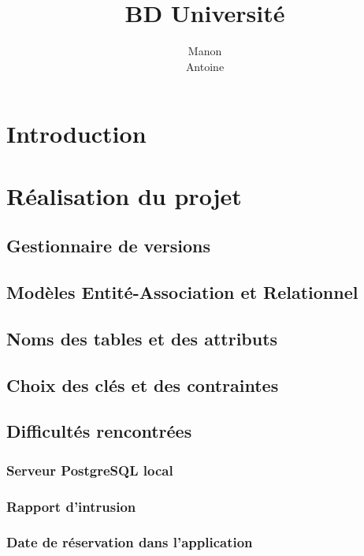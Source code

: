 \documentclass[12pt,titlepage,a4paper]{report}
\title{BD Université}
\author{Manon \bsc{Ansart}\\ Antoine \bsc{Augusti}}
\begin{document}

	\dominitoc
	\tableofcontents

	\chapter{Introduction}
		

	\chapter{Réalisation du projet}
		\section{Gestionnaire de versions}
		

		\section{Modèles Entité-Association et Relationnel}
		

		\section{Noms des tables et des attributs}
		

		\section{Choix des clés et des contraintes}
		

		\section{Difficultés rencontrées}  
			\subsection{Serveur PostgreSQL local}
			
			
			\subsection{Rapport d'intrusion}
			

			\subsection{Date de réservation dans l'application}
			
\end{document}
